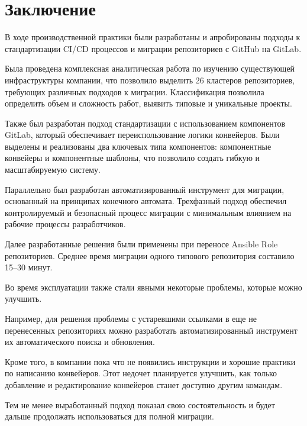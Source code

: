 \chapter*{Заключение} \label{ch:general-conclusion}

В ходе производственной практики были разработаны и апробированы подходы к стандартизации CI/CD процессов и миграции репозиториев с GitHub на GitLab.

Была проведена комплексная аналитическая работа по изучению существующей инфраструктуры компании,
что позволило выделить 26 кластеров репозиториев,
требующих различных подходов к миграции.
Классификация позволила определить объем и сложность работ, выявить типовые и уникальные проекты.

Также был разработан подход стандартизации с использованием компонентов GitLab,
который обеспечивает переиспользование логики конвейеров.
Были выделены и реализованы два ключевых типа компонентов: компонентные конвейеры и компонентные шаблоны,
что позволило создать гибкую и масштабируемую систему.

Параллельно был разработан автоматизированный инструмент для миграции,
основанный на принципах конечного автомата.
Трехфазный подход обеспечил контролируемый и безопасный процесс миграции с минимальным влиянием на рабочие процессы разработчиков.

Далее разработанные решения были применены при переносе Ansible Role репозиториев.
Среднее время миграции одного типового репозитория составило 15--30 минут.

Во время эксплуатации также стали явными некоторые проблемы, которые можно улучшить.

Например, для решения проблемы с устаревшими ссылками в еще не перенесенных репозиториях
можно разработать автоматизированный инструмент их автоматического поиска и обновления.

Кроме того, в компании пока что не появились инструкции и хорошие практики по написанию конвейеров.
Этот недочет планируется улучшить, как только добавление и редактирование конвейеров станет доступно другим командам.

Тем не менее выработанный подход показал свою состоятельность и будет дальше продолжать использоваться для полной миграции.
